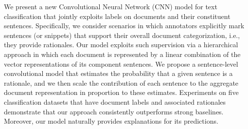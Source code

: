 We present a new Convolutional Neural Network (CNN) model for text classification that jointly exploits labels on documents and their constituent sentences. Specifically, we consider scenarios in which annotators explicitly mark sentences (or snippets) that support their overall document categorization, i.e., they provide rationales. Our model exploits such supervision via a hierarchical approach in which each document is represented by a linear combination of the vector representations of its component sentences. We propose a sentence-level convolutional model that estimates the probability that a given sentence is a rationale, and we then scale the contribution of each sentence to the aggregate document representation in proportion to these estimates. Experiments on five classification datasets that have document labels and associated rationales demonstrate that our approach consistently outperforms strong baselines. Moreover, our model naturally provides explanations for its predictions.
